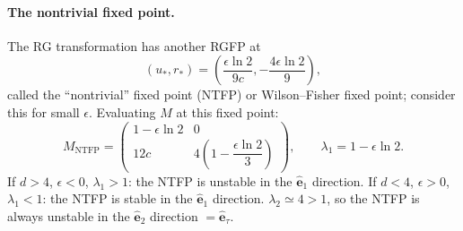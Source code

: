\paragraph{The nontrivial fixed point.} The RG transformation has another RGFP at
\begin{equation}
  (u_*,r_*) = \left(\frac{\epsilon\ln 2}{9c},-\frac{4\epsilon\ln 2}{9}\right),
\end{equation}
called the ``nontrivial'' fixed point (NTFP) or Wilson--Fisher fixed point; consider this for small
$\epsilon$. Evaluating $M$ at this fixed point:
\begin{equation}
  M_{\text{NTFP}} = \begin{pmatrix}1-\epsilon\ln 2 & 0\\[6pt] 12c & 4\left(1-\dfrac{\epsilon\ln 2}{3}\right)\end{pmatrix},
  \qquad \lambda_1 = 1-\epsilon\ln 2 .
\end{equation}
If $d>4$, $\epsilon<0$, $\lambda_1>1$: the NTFP is unstable in the $\hat{\mathbf e}_1$ direction. If $d<4$,
$\epsilon>0$, $\lambda_1<1$: the NTFP is stable in the $\hat{\mathbf e}_1$ direction. $\lambda_2\simeq 4>1$, so the
NTFP is always unstable in the $\hat{\mathbf e}_2$ direction $=\hat{\mathbf e}_\tau$.

